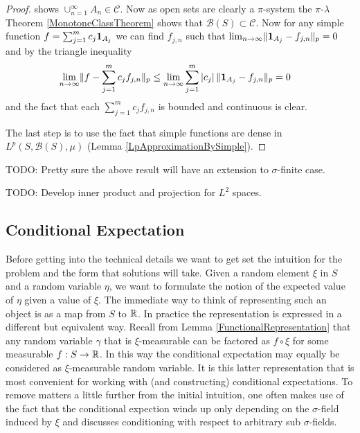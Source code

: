 \begin{proof}
shows $\cup_{n=1}^\infty A_n \in \mathcal{C}$.  Now as open sets are
clearly a $\pi$-system the
$\pi$-$\lambda$ Theorem \ref{MonotoneClassTheorem} shows that
$\mathcal{B}(S) \subset \mathcal{C}$.  Now for any simple function $f
= \sum_{j=1}^m c_j \textbf{1}_{A_j}$ we can find $f_{j,n}$ such
that $\lim_{n \to \infty} \lVert \textbf{1}_{A_j} - f_{j,n} \rVert_p = 0$
and by the triangle inequality
\begin{align*}
\lim_{n \to \infty} \lVert f - \sum_{j=1}^m c_j f_{j,n} \rVert_p &\leq
\lim_{n \to \infty} \sum_{j=1}^m \left \vert c_j \right \vert \lVert \textbf{1}_{A_j}
  - f_{j,n} \rVert_p = 0
\end{align*}
and the fact that each $\sum_{j=1}^m c_j f_{j,n}$ is bounded and continuous is clear.

The last step is to use the fact that simple functions are dense in
$L^p(S, \mathcal{B}(S), \mu)$ (Lemma \ref{LpApproximationBySimple}).
\end{proof}

TODO: Pretty sure the above result will have an extension to
$\sigma$-finite case.

TODO: Develop inner product and projection for $L^2$ spaces.

\subsection{Conditional Expectation}
 Before getting into the technical details we want to get set the
intuition for the problem and the form that solutions will take.
Given a random element $\xi$ in $S$ and a random variable $\eta$, we want to
formulate the notion of the expected value of $\eta$ given a value of
$\xi$.  The immediate way to think of representing such an object is as a map from
$S$ to $\mathbb{R}$.  In practice the representation is expressed in a
different but equivalent way.  Recall from Lemma
\ref{FunctionalRepresentation} that any random variable
$\gamma$ that is $\xi$-measurable can be factored as $f \circ
\xi$ for some measurable $f : S \to \mathbb{R}$.  In this way the
conditional expectation may equally be considered as $\xi$-measurable
random variable.  It is this latter representation that is most
convenient for working with (and constructing) conditional
expectations.  To remove matters a little further from the initial
intuition, one often makes use of the fact that the conditional
expection winds up only depending on the $\sigma$-field induced by
$\xi$ and discusses conditioning with respect to arbitrary sub
$\sigma$-fields.

